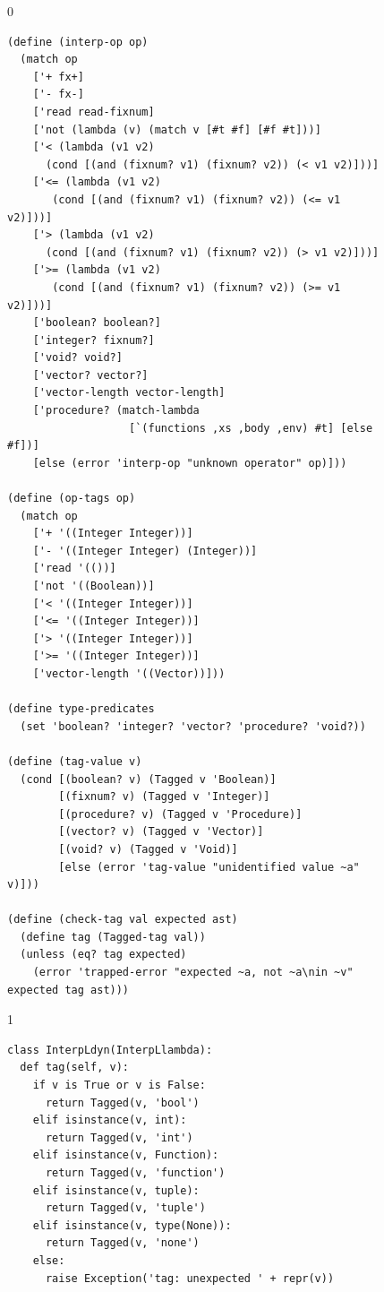 \documentclass[7x10]{TimesAPriori_MIT}%
\def\racketEd{0}
\def\pythonEd{1}
\def\edition{1}
\newcommand{\pythonColor}[0]{}
\numberwithin{theorem}{chapter}
\numberwithin{definition}{chapter}
\numberwithin{equation}{chapter}
\begin{document}
\begin{figure}[tbp]
  \begin{tcolorbox}[colback=white]
    {\if\edition\racketEd
\begin{lstlisting}[basicstyle=\ttfamily\footnotesize]
(define (interp-op op)
  (match op
    ['+ fx+]
    ['- fx-]
    ['read read-fixnum]
    ['not (lambda (v) (match v [#t #f] [#f #t]))]
    ['< (lambda (v1 v2)
	  (cond [(and (fixnum? v1) (fixnum? v2)) (< v1 v2)]))]
    ['<= (lambda (v1 v2)
	   (cond [(and (fixnum? v1) (fixnum? v2)) (<= v1 v2)]))]
    ['> (lambda (v1 v2)
	  (cond [(and (fixnum? v1) (fixnum? v2)) (> v1 v2)]))]
    ['>= (lambda (v1 v2)
	   (cond [(and (fixnum? v1) (fixnum? v2)) (>= v1 v2)]))]
    ['boolean? boolean?]
    ['integer? fixnum?]
    ['void? void?]
    ['vector? vector?]
    ['vector-length vector-length]
    ['procedure? (match-lambda
                   [`(functions ,xs ,body ,env) #t] [else #f])]
    [else (error 'interp-op "unknown operator" op)]))

(define (op-tags op)
  (match op
    ['+ '((Integer Integer))]
    ['- '((Integer Integer) (Integer))]
    ['read '(())]
    ['not '((Boolean))]
    ['< '((Integer Integer))]
    ['<= '((Integer Integer))]
    ['> '((Integer Integer))]
    ['>= '((Integer Integer))]
    ['vector-length '((Vector))]))

(define type-predicates
  (set 'boolean? 'integer? 'vector? 'procedure? 'void?))

(define (tag-value v)
  (cond [(boolean? v) (Tagged v 'Boolean)]
        [(fixnum? v) (Tagged v 'Integer)]
        [(procedure? v) (Tagged v 'Procedure)]
        [(vector? v) (Tagged v 'Vector)]
        [(void? v) (Tagged v 'Void)]
        [else (error 'tag-value "unidentified value ~a" v)]))

(define (check-tag val expected ast)
  (define tag (Tagged-tag val))
  (unless (eq? tag expected)
    (error 'trapped-error "expected ~a, not ~a\nin ~v" expected tag ast)))
\end{lstlisting}
\fi}
{\if\edition\pythonEd\pythonColor
\begin{lstlisting}[basicstyle=\ttfamily\footnotesize]
class InterpLdyn(InterpLlambda):
  def tag(self, v):
    if v is True or v is False:
      return Tagged(v, 'bool')
    elif isinstance(v, int):
      return Tagged(v, 'int')
    elif isinstance(v, Function):
      return Tagged(v, 'function')
    elif isinstance(v, tuple):
      return Tagged(v, 'tuple')
    elif isinstance(v, type(None)):
      return Tagged(v, 'none')
    else:
      raise Exception('tag: unexpected ' + repr(v))


\end{lstlisting}}
\end{tcolorbox}
\end{figure}
\end{document}
